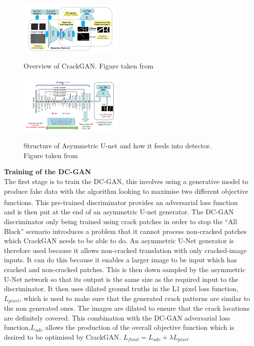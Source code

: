 \documentclass[11pt]{article}		%
\newcommand{\supercite}[1]{\textsuperscript{\cite{#1}}}		%
\begin{document}
	        \begin{figure}[h]
				\centering
				\begin{multicols}{2}
					\includegraphics[width=0.45\textwidth]{CrackGan_Overview}
					\caption{Overview of CrackGAN. Figure taken from \cite{CrackGAN1}}
					\label{crackGAN_Overview}
					\columnbreak
					\includegraphics[width=0.45\textwidth]{assymmetric_unet}
					\caption{Structure of Asymmetric U-net and how it feeds into detector. Figure taken from \cite{CrackGAN1}}
					\label{assymmetric-unet}
			 \end{multicols}
			\end{figure}	
    		\textbf{Training of the DC-GAN}
    		\\
   		    The first stage is to train the DC-GAN, this involves using a generative model to produce fake data with the algorithm looking to maximise two different objective functions.\supercite{CrackGAN1} This pre-trained discriminator provides an adversarial loss function and is then put at the end of an asymmetric U-net generator. The DC-GAN discriminator only being trained using crack patches in order to stop the “All Black” scenario introduces a problem that it cannot process non-cracked patches which CrackGAN needs to be able to do. An asymmetric U-Net generator is therefore used because it allows non-cracked translation with only cracked-image inputs. It can do this because it enables a larger image to be input which has cracked and non-cracked patches. This is then down sampled by the asymmetric U-Net network so that its output is the same size as the required input to the discriminator. It then uses dilated ground truths in the L1 pixel loss function, $L_{pixel}$, which is used to make sure that the generated crack patterns are similar to the non generated ones. The images are dilated to ensure that the crack locations are definitely covered. This combination with the DC-GAN adversarial loss function,$L_{adv}$  allows the production of the overall objective function which is desired to be optimised by CrackGAN.
		    $L_{final}=L_{adv}+\lambda L_{pixel}$
		  
\end{document}
